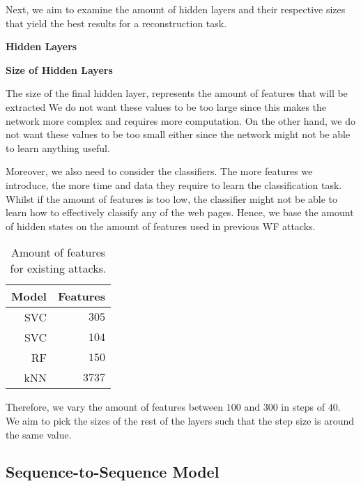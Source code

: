 Next, we aim to examine the amount of hidden layers and their respective sizes that yield the best results for a reconstruction task.

\noindent
\textbf{Hidden Layers}


\noindent
\textbf{Size of Hidden Layers}

The size of the final hidden layer, represents the amount of features that will be extracted
We do not want these values to be too large since this makes the network more complex and requires more computation.
On the other hand, we do not want these values to be too small either since the network might not be able to learn anything useful.

Moreover, we also need to consider the classifiers.
The more features we introduce, the more time and data they require to learn the classification task.
Whilst if the amount of features is too low, the classifier might not be able to learn how to effectively classify any of the web pages.
Hence, we base the amount of hidden states on the amount of features used in previous WF attacks.

\begin{table}[ht]
  \centering
  \begin{tabular}{ r r } \hline
    \multicolumn{1}{c}{\textbf{Model}} & \multicolumn{1}{c}{\textbf{Features}} \\ \hline
    SVC \cite{panchenko1} & $305$ \\
    SVC \cite{panchenko2} & $104$ \\
    RF \cite{kfingerprinting} & $150$ \\
    kNN \cite{wang_cai_johnson_nithyanand_goldberg_2014} & $3737$ \\
    \hline
  \end{tabular}
  \caption{Amount of features for existing attacks.}
  \label{table:feature-wf-attacks}
\end{table}

Therefore, we vary the amount of features between $100$ and $300$ in steps of $40$.
We aim to pick the sizes of the rest of the layers such that the step size is around the same value.


\subsection{Sequence-to-Sequence Model}

